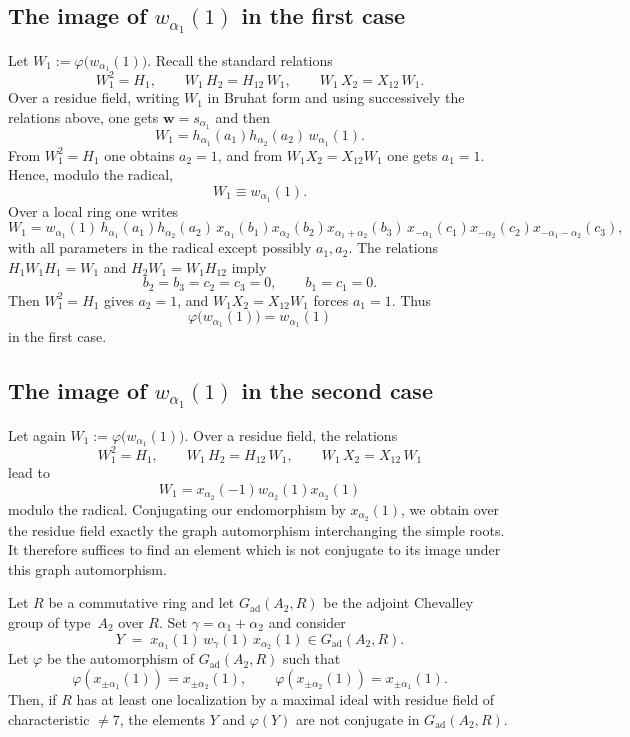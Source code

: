 \documentclass[]{jgcc}
\numberwithin{equation}{section}
\begin{document}
\subsection{\texorpdfstring{The image of $w_{\alpha_1}(1)$ in the first case}{The image of walpha1(1) in the first case}}\label{subsec:image-walpha1}

Let $W_1:=\varphi\bigl(w_{\alpha_1}(1)\bigr)$.
Recall the standard relations
\[
W_1^2=H_1,\qquad W_1\,H_2=H_{12}\,W_1,\qquad W_1\,X_2=X_{12}\,W_1.
\]
Over a residue field, writing $W_1$ in Bruhat form and using successively the relations above,
one gets $\mathbf w=s_{\alpha_1}$ and then
\[
W_1=h_{\alpha_1}(a_1)h_{\alpha_2}(a_2)\,w_{\alpha_1}(1).
\]
From $W_1^2=H_1$ one obtains $a_2=1$, and from $W_1X_2=X_{12}W_1$ one gets $a_1=1$.
Hence, modulo the radical,
\[
W_1\equiv w_{\alpha_1}(1).
\]
Over a local ring one writes
\[
W_1=w_{\alpha_1}(1)\,h_{\alpha_1}(a_1)h_{\alpha_2}(a_2)\,
x_{\alpha_1}(b_1)x_{\alpha_2}(b_2)x_{\alpha_1+\alpha_2}(b_3)\,
x_{-\alpha_1}(c_1)x_{-\alpha_2}(c_2)x_{-\alpha_1-\alpha_2}(c_3),
\]
with all parameters in the radical except possibly $a_1,a_2$.
The relations $H_1W_1H_1=W_1$ and $H_2W_1=W_1H_{12}$ imply
\[
b_2=b_3=c_2=c_3=0,\qquad b_1=c_1=0.
\]
Then $W_1^2=H_1$ gives $a_2=1$, and $W_1X_2=X_{12}W_1$ forces $a_1=1$.
Thus
\[
\varphi\bigl(w_{\alpha_1}(1)\bigr)=w_{\alpha_1}(1)
\]
in the first case.

\subsection{\texorpdfstring{The image of $w_{\alpha_1}(1)$ in the second case}{The image of walpha1(1) in the second case}}\label{subsec:image-walpha2}

Let again $W_1:=\varphi\bigl(w_{\alpha_1}(1)\bigr)$.
Over a residue field, the relations
\[
W_1^2=H_1,\qquad W_1\,H_2=H_{12}\,W_1,\qquad W_1\,X_2=X_{12}\,W_1
\]
lead to
\[
W_1=x_{\alpha_2}(-1)w_{\alpha_2}(1)x_{\alpha_2}(1)
\]
modulo the radical.
Conjugating our endomorphism by $x_{\alpha_2}(1)$, we obtain over the residue field exactly the graph automorphism interchanging the simple roots.
It therefore suffices to find an element which is not conjugate to its image under this graph automorphism.

\begin{prop}
Let $R$ be a commutative ring and let $G_{\mathrm{ad}}(A_2,R)$ be the adjoint Chevalley group of type~$A_2$ over $R$.
Set $\gamma=\alpha_1+\alpha_2$ and consider
\[
Y \;=\; x_{\alpha_1}(1)\,w_\gamma(1)\,x_{\alpha_2}(1)\in G_{\mathrm{ad}}(A_2,R).
\]
Let $\varphi$ be the automorphism of $G_{\mathrm{ad}}(A_2,R)$ such that
\[
\varphi(x_{\pm \alpha_1}(1))=x_{\pm \alpha_2}(1),\qquad
\varphi(x_{\pm \alpha_2}(1))=x_{\pm \alpha_1}(1).
\]
Then, if $R$ has at least one localization by a maximal ideal with residue field of characteristic $\ne 7$, the elements $Y$ and $\varphi(Y)$ are not conjugate in $G_{\mathrm{ad}}(A_2,R)$.
\end{prop}
\end{document}
